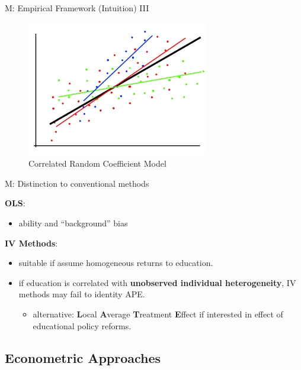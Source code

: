\documentclass[10pt,ignorenonframetext,]{beamer}
\providecommand{\tightlist}{%
  \setlength{\itemsep}{0pt}\setlength{\parskip}{0pt}}
\begin{document}
\begin{frame}{M: Empirical Framework (Intuition) III}
\protect\hypertarget{m-empirical-framework-intuition-iii}{}

\begin{figure}
\centering
\includegraphics[width=3.125in,height=\textheight]{img/rcmodel003.png}
\caption{Correlated Random Coefficient Model}
\end{figure}

\end{frame}

\begin{frame}{M: Distinction to conventional methods}
\protect\hypertarget{m-distinction-to-conventional-methods}{}

\textbf{OLS}:

\begin{itemize}
\tightlist
\item
  ability and ``background'' bias
\end{itemize}

\textbf{IV Methods}:

\begin{itemize}
\tightlist
\item
  suitable if assume homogeneous returns to education.
\item
  if education is correlated with \textbf{unobserved individual
  heterogeneity}, IV methods may fail to identity APE.

  \begin{itemize}
  \tightlist
  \item
    alternative: \textbf{L}ocal \textbf{A}verage \textbf{T}reatment
    \textbf{E}ffect if interested in effect of educational policy
    reforms.
  \end{itemize}
\end{itemize}

\end{frame}

\hypertarget{econometric-approaches}{%
\subsection{Econometric Approaches}\label{econometric-approaches}}
\end{document}
